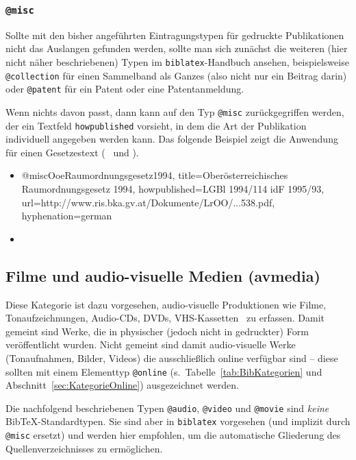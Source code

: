 
\subsubsection{\texttt{@misc}}
\label{sec:@misc}
Sollte mit den bisher angeführten Eintragungstypen für gedruckte Publikationen
nicht das Auslangen gefunden werden, sollte man sich zunächst die weiteren (hier nicht näher beschriebenen) 
Typen im \texttt{biblatex}-Handbuch \cite{Lehman2016} ansehen, beispielsweise
\texttt{@collection} für einen Sammelband als Ganzes (also nicht nur ein Beitrag darin)
oder \texttt{@patent} für ein Patent oder eine Patentanmeldung.

Wenn nichts davon passt, dann kann auf den Typ \texttt{@misc} zurückgegriffen werden, der ein
Textfeld \texttt{howpublished} vorsieht, in dem die Art der Publikation individuell 
angegeben werden kann. Das folgende Beispiel zeigt die Anwendung für einen Gesetzestext 
(\sa\ \cite{FhStG1993} und \cite{EuRichtlinie2000}).
%
\begin{itemize}
\item[]
\begin{GenericCode}[numbers=none]
@misc{OoeRaumordnungsgesetz1994,
  title={Oberösterreichisches Raumordnungsgesetz 1994},
  howpublished={LGBl 1994/114 idF 1995/93},
  url={http://www.ris.bka.gv.at/Dokumente/LrOO/...538.pdf},
  hyphenation={german}
}
\end{GenericCode}
\item[\cite{OoeRaumordnungsgesetz1994}] 
\end{itemize}


\subsection{Filme und audio-visuelle Medien (\textsf{avmedia})}
\label{sec:KategorieAvmedia}
Diese Kategorie ist dazu vorgesehen, audio-visuelle Produktionen wie Filme, 
Tonaufzeichnungen, Audio-CDs, DVDs, VHS-Kassetten \usw\ zu erfassen.
Damit gemeint sind Werke, die in physischer (jedoch nicht in gedruckter) Form
veröffentlicht wurden.
Nicht gemeint sind damit audio-visuelle Werke (Tonaufnahmen, Bilder, Videos) 
die ausschließlich online verfügbar sind -- diese sollten mit einem Elementtyp 
\texttt{@online} (s.\ Tabelle~\ref{tab:BibKategorien} und Abschnitt~\ref{sec:KategorieOnline}) ausgezeichnet werden.

Die nachfolgend beschriebenen Typen \texttt{@audio}, \texttt{@video} und \texttt{@movie} 
sind \emph{keine} Bib\-TeX-Standardtypen. Sie sind aber in \texttt{biblatex} vorgesehen
(und implizit durch \texttt{@misc} ersetzt) und werden hier empfohlen, um die automatische 
Gliederung des Quellenverzeichnisses zu ermöglichen.


